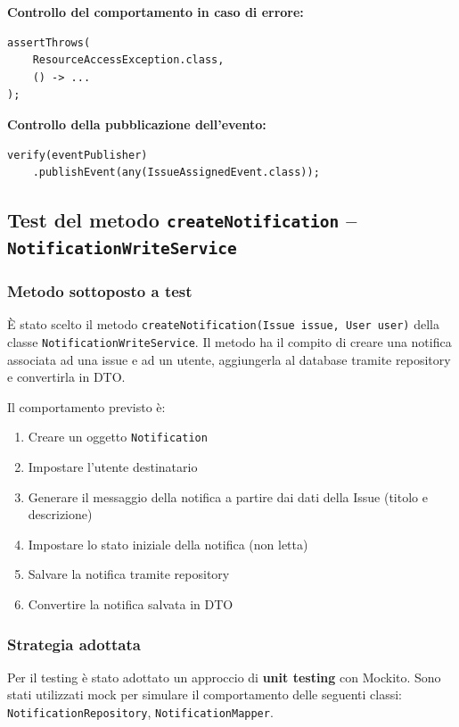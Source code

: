 \documentclass[a4paper,12pt]{article}
\begin{document}
\textbf{Controllo del comportamento in caso di errore:}
\begin{lstlisting}
assertThrows(
    ResourceAccessException.class,
    () -> ...
);
\end{lstlisting}

\textbf{Controllo della pubblicazione dell'evento:}
\begin{lstlisting}
verify(eventPublisher)
    .publishEvent(any(IssueAssignedEvent.class));
\end{lstlisting}


\subsection{Test del metodo \texttt{createNotification} -- \texttt{NotificationWriteService}}
\label{sec:testCreateNotificationDoc}

\subsubsection{Metodo sottoposto a test}
È stato scelto il metodo \texttt{createNotification(Issue issue, User user)} della classe \texttt{NotificationWriteService}. Il metodo ha il compito di creare una notifica associata ad una issue e ad un utente, aggiungerla al database tramite repository e convertirla in DTO.

Il comportamento previsto è:
\begin{enumerate}
    \item Creare un oggetto \texttt{Notification}
    \item Impostare l'utente destinatario
    \item Generare il messaggio della notifica a partire dai dati della Issue (titolo e descrizione)
    \item Impostare lo stato iniziale della notifica (non letta)
    \item Salvare la notifica tramite repository
    \item Convertire la notifica salvata in DTO
\end{enumerate}

\subsubsection{Strategia adottata}
Per il testing è stato adottato un approccio di \textbf{unit testing} con Mockito. Sono stati utilizzati mock per simulare il comportamento delle seguenti classi: \texttt{NotificationRepository}, \texttt{NotificationMapper}.
\end{document}
